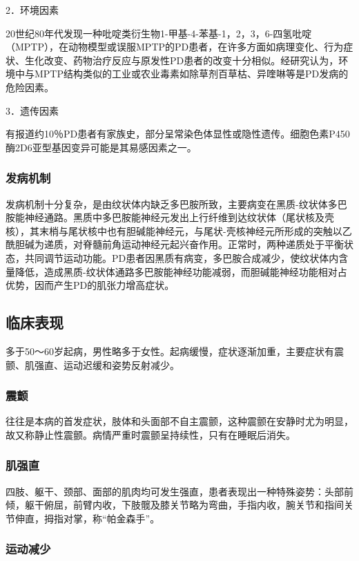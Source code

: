 2．环境因素

20世纪80年代发现一种吡啶类衍生物1-甲基-4-苯基-1，2，3，6-四氢吡啶（MPTP），在动物模型或误服MPTP的PD患者，在许多方面如病理变化、行为症状、生化改变、药物治疗反应与原发性PD患者的改变十分相似。经研究认为，环境中与MPTP结构类似的工业或农业毒素如除草剂百草枯、异喹啉等是PD发病的危险因素。

3．遗传因素

有报道约10％PD患者有家族史，部分呈常染色体显性或隐性遗传。细胞色素P450酶2D6亚型基因变异可能是其易感因素之一。

\subsubsection{发病机制}

发病机制十分复杂，是由纹状体内缺乏多巴胺所致，主要病变在黑质-纹状体多巴胺能神经通路。黑质中多巴胺能神经元发出上行纤维到达纹状体（尾状核及壳核），其末梢与尾状核中也有胆碱能神经元，与尾状-壳核神经元所形成的突触以乙酰胆碱为递质，对脊髓前角运动神经元起兴奋作用。正常时，两种递质处于平衡状态，共同调节运动功能。PD患者因黑质有病变，多巴胺合成减少，使纹状体内含量降低，造成黑质-纹状体通路多巴胺能神经功能减弱，而胆碱能神经功能相对占优势，因而产生PD的肌张力增高症状。

\subsection{临床表现}

多于50～60岁起病，男性略多于女性。起病缓慢，症状逐渐加重，主要症状有震颤、肌强直、运动迟缓和姿势反射减少。

\subsubsection{震颤}

往往是本病的首发症状，肢体和头面部不自主震颤，这种震颤在安静时尤为明显，故又称静止性震颤。病情严重时震颤呈持续性，只有在睡眠后消失。

\subsubsection{肌强直}

四肢、躯干、颈部、面部的肌肉均可发生强直，患者表现出一种特殊姿势：头部前倾，躯干俯屈，前臂内收，下肢髋及膝关节略为弯曲，手指内收，腕关节和指间关节伸直，拇指对掌，称“帕金森手”。

\subsubsection{运动减少}

